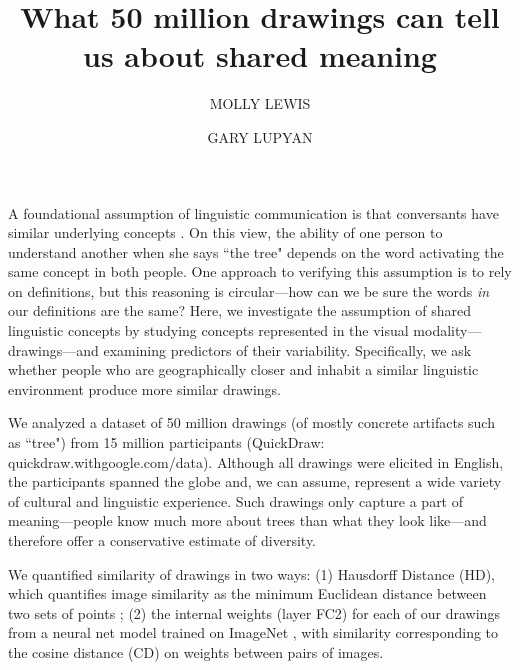 \documentclass{evolang12}
\begin{document}
\title{What 50 million drawings can tell us about shared meaning}
\author[*1,2]{MOLLY LEWIS}
\author[1]{GARY LUPYAN}

\maketitle

A foundational assumption of linguistic communication is that conversants have similar underlying concepts \cite{brennan1996conceptual,wierzbicka2012understanding}. On this view, the ability of one person to understand another when she says ``the tree" depends on the word activating the same concept in both people. One approach to verifying this assumption is to rely on definitions, but this reasoning is circular---how can we be sure the words {\it in} our definitions are the same? Here, we investigate the assumption of shared linguistic concepts by studying concepts represented in the visual modality---drawings---and examining predictors of their variability. Specifically, we ask whether people who are geographically closer and inhabit a similar linguistic environment produce more similar drawings.

We analyzed a dataset of 50 million drawings (of mostly concrete artifacts such as ``tree") from 15 million participants (QuickDraw: quickdraw.withgoogle.com/data). Although all drawings were elicited in English, the participants spanned the globe and, we can assume, represent a wide variety of cultural and linguistic experience. Such drawings only capture a part of meaning---people know much more about trees than what they look like---and therefore offer a conservative estimate of diversity.

We quantified similarity of drawings in two ways: (1) Hausdorff Distance (HD), which quantifies image similarity as the minimum Euclidean distance between two sets of points \cite{Huttenlocher93comparingimages}; (2) the internal weights (layer FC2) for each of our drawings from a neural net model trained on ImageNet \cite{deng2009imagenet}, with similarity corresponding to the cosine distance (CD) on weights between pairs of images. 
\end{document}
